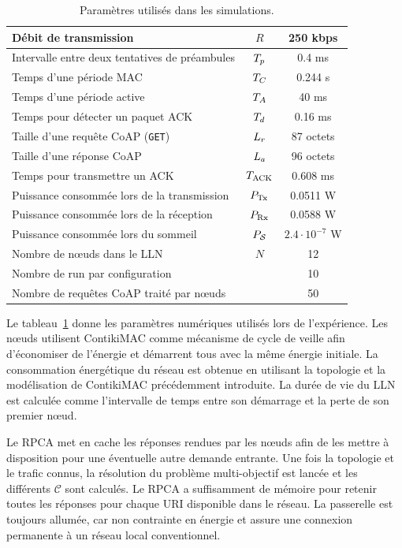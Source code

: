 \begin{table}[ht]
\centering
\begin{tabular}{|l|c|c|}
\hline
Débit de transmission & $R$ & 250 kbps \\
\hline
Intervalle entre deux tentatives de préambules & $T_p$ & 0.4 ms \\
\hline
Temps d'une période MAC & $T_C$ & 0.244 s\\
\hline
Temps d'une période active & $T_A$ & 40 ms\\
\hline
Temps pour détecter un paquet \ac{ACK} & $T_d$ & 0.16 ms \\
\hline
Taille d'une requête CoAP (\texttt{GET}) & $L_r$ & 87 octets\\
\hline
Taille d'une réponse CoAP & $L_a$ & 96 octets \\
\hline
Temps pour transmettre un \ieee{} \ac{ACK} & $T_{\textrm{ACK}}$ & 0.608 ms  \\
\hline
Puissance consommée lors de la transmission & $P_{\textrm{Tx}} $ & 0.0511 W  \\
\hline
Puissance consommée lors de la réception & $P_{\textrm{Rx}} $ & 0.0588 W  \\
\hline
Puissance consommée lors du sommeil & $P_{\mathcal{S}}$ & $2.4\cdot 10^{-7}$ W \\
\hline
Nombre de nœuds dans le \ac{LLN}  & $N$ & 12 \\
\hline
Nombre de run par configuration &  & 10  \\
\hline
Nombre de requêtes \ac{CoAP} traité par nœuds &  & 50 \\
\hline
\end{tabular}
\caption{Paramètres utilisés dans les simulations.}

\label{cache:table:sim_parameters}
\end{table}

Le tableau~\ref{cache:table:sim_parameters} donne les paramètres numériques utilisés lors de l'expérience.
Les nœuds utilisent ContikiMAC comme mécanisme de cycle de veille afin d'économiser de l'énergie et démarrent tous avec la même énergie initiale.
La consommation énergétique du réseau est obtenue en utilisant la topologie et la modélisation de ContikiMAC précédemment introduite.
La durée de vie du \ac{LLN} est calculée comme l'intervalle de temps entre son démarrage et la perte de son premier nœud.

Le \ac{RPCA} met en cache les réponses rendues par les nœuds afin de les mettre à disposition pour une éventuelle autre demande entrante.
Une fois la topologie et le trafic connus, la résolution du problème multi-objectif est lancée et les différents $\mathcal{C}$ sont calculés.
Le \ac{RPCA} a suffisamment de mémoire pour retenir toutes les réponses pour chaque \ac{URI} disponible dans le réseau.
La passerelle est toujours allumée, car non contrainte en énergie et assure une connexion permanente à un réseau local conventionnel.

